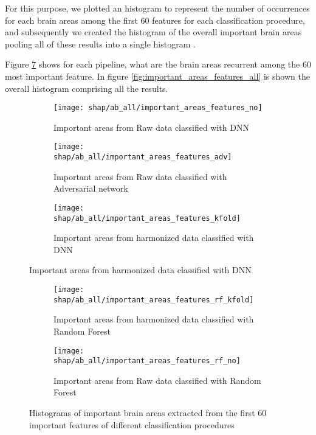 \documentclass[11pt]{report}
\begin{document}
For this purpose, we plotted an histogram to represent the number of occurrences for each brain areas among the first 60 features for each classification procedure, and subsequently we created the histogram of the overall important brain areas pooling all of these results into a single histogram .

Figure \ref{fig:histograms_60} shows for each pipeline, what are the brain areas recurrent among the 60 most important feature.
In figure \ref{fig:important_areas_features_all} is shown the overall histogram comprising all the results.


\begin{figure}
\centering
\begin{subfigure}[b]{1\columnwidth}
   \texttt{[image: shap/ab\_all/important\_areas\_features\_no]}
   \caption{Important areas from Raw data classified with DNN}
   \label{}
\end{subfigure}

\begin{subfigure}[b]{1\columnwidth}
   \texttt{[image: shap/ab\_all/important\_areas\_features\_adv]}
   \caption{Important areas from Raw data classified with Adversarial network}
   \label{}
\end{subfigure}

\begin{subfigure}[b]{1\columnwidth}
   \texttt{[image: shap/ab\_all/important\_areas\_features\_kfold]}
   \caption{Important areas from harmonized data classified with DNN}
   \label{}
\end{subfigure}
\end{figure}
\begin{figure}\ContinuedFloat
\begin{subfigure}[b]{1\columnwidth}
   \texttt{[image: shap/ab\_all/important\_areas\_features\_rf\_kfold]}
   \caption{Important areas from harmonized data classified with Random Forest}
   \label{}
\end{subfigure}

\begin{subfigure}[b]{1\columnwidth}
   \texttt{[image: shap/ab\_all/important\_areas\_features\_rf\_no]}
   \caption{Important areas from Raw data classified with Random Forest}
   \label{}
\end{subfigure}
\caption{Histograms of important brain areas extracted from the first 60 important features of different classification procedures}
\label{fig:histograms_60}
\end{figure}
\end{document}
